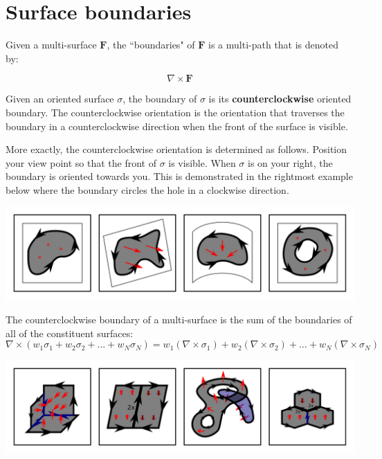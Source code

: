 \section{Surface boundaries}

Given a multi-surface \(\mathbf{F}\), the ``boundaries" of \(\mathbf{F}\) is a multi-path that is denoted by: 

\[\nabla \times \mathbf{F}\]

Given an oriented surface \(\sigma\), the boundary of \(\sigma\) is its {\bf counterclockwise} oriented boundary. The counterclockwise orientation is the orientation that traverses the boundary in a counterclockwise direction when the front of the surface is visible. 

More exactly, the counterclockwise orientation is determined as follows. Position your view point so that the front of \(\sigma\) is visible. When \(\sigma\) is on your right, the boundary is oriented towards you. This is demonstrated in the rightmost example below where the boundary circles the hole in a clockwise direction.

\begin{center}
\includegraphics[width = \textwidth]{Boundaries/Surface_boundaries/surface_boundary_examples}
\end{center}

The counterclockwise boundary of a multi-surface is the sum of the boundaries of all of the constituent surfaces:
\[\nabla \times (w_1 \sigma_1 + w_2 \sigma_2 + ... + w_N \sigma_N)
= w_1(\nabla \times \sigma_1) + w_2(\nabla \times \sigma_2) + ... + w_N(\nabla \times \sigma_N)\]

\begin{center}
\includegraphics[width = \textwidth]{Boundaries/Surface_boundaries/surface_boundary_examples_2}
\end{center}

